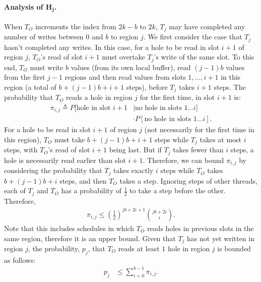 \paragraph*{Analysis of $\boldsymbol{H_j}$.} When $T_O$ increments the index from $2k-b$ to $2k$, $T_j$ may have completed any number of writes between $0$ and $b$ to region $j$. We first consider the case that $T_j$ hasn't completed any writes. In this case, for a hole to be read in slot $i+1$ of region $j$, $T_O$'s read of slot $i+1$ must overtake $T_j$'s write of the same slot. To this end, $T_O$ must write $b$ values (from its own local buffer), read $(j-1)b$ values from the first $j-1$ regions and then read values from slots $1,\dots,i+1$ in this region (a total of $b+(j-1)b+i+1$ steps), before $T_j$ takes $i+1$ steps. The probability that $T_O$ reads a hole in region $j$ for the first time, in slot $i+1$ is:
\begin{align*}
\pi_{i,j} \triangleq P[\text{hole in slot }i+1  &\mid \text{no hole in slots } 1\dots i] \\
                                            & \cdot P[\text{no hole in slots } 1\dots i].
\end{align*}
For a hole to be read in slot $i+1$ of region $j$ (not necessarily for the first time in this region), $T_O$ must take $b+(j-1)b+i+1$ steps while $T_j$ takes at most $i$ steps, with $T_O$'s read of slot $i+1$ being last.
But if $T_j$ takes fewer than $i$ steps, a hole is necessarily read earlier than slot $i+1$. Therefore, we can bound $\pi_{i,j}$ by considering the probability that $T_j$ takes exactly $i$ steps while $T_O$ takes $b+(j-1)b+i$ steps, and then $T_O$ takes a step. Ignoring steps of other threads, each of $T_j$ and $T_O$ has a probability of $\frac{1}{2}$ to take a step before the other. Therefore,
\begin{align}
\pi_{i,j} \leq \left(\frac{1}{2}\right)^{jb + 2i +1} {{jb+2i} \choose i}. \label{eq:pi-i-j}
\end{align}
Note that this includes schedules in which $T_O$ reads holes in previous slots in the same region, therefore it is an upper bound.
Given that $T_j$ has not yet written in region $j$, the probability, $p_j$, that $T_O$ reads at least $1$ hole in region $j$ is bounded as follows:
\begin{align}
    p_j &\leq \sum_{i=0}^{b-1} \pi_{i,j}. \label{eq:p-j}
\end{align}
